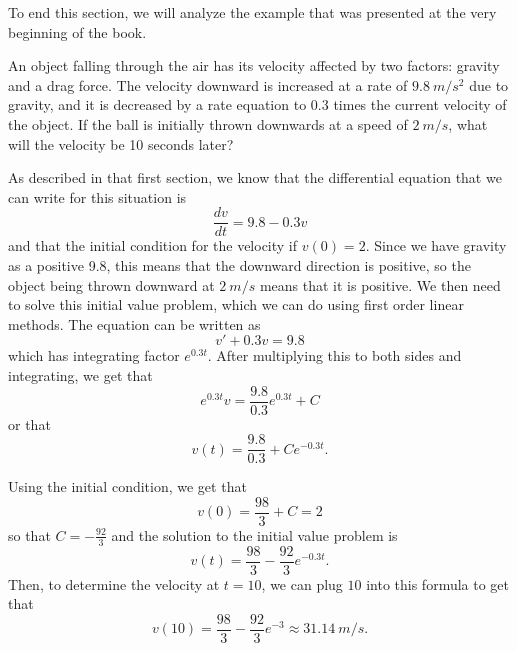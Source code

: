 To end this section, we will analyze the example that was presented at the very beginning of the book.

\begin{example}
An object falling through the air has its velocity affected by two factors: gravity and a drag force. The velocity downward is increased at a rate of $9.8\ m/s^2$ due to gravity, and it is decreased by a rate equation to $0.3$ times the current velocity of the object. If the ball is initially thrown downwards at a speed of $2\ m/s$, what will the velocity be 10 seconds later?
\end{example}

\begin{exampleSol}
As described in that first section, we know that the differential equation that we can write for this situation is
\begin{equation*}
\frac{dv}{dt} = 9.8 - 0.3v
\end{equation*}
and that the initial condition for the velocity if $v(0) = 2$. Since we have gravity as a positive 9.8, this means that the downward direction is positive, so the object being thrown downward at $2\ m/s$ means that it is positive. We then need to solve this initial value problem, which we can do using first order linear methods. The equation can be written as
\begin{equation*}
v' + 0.3v = 9.8
\end{equation*} which has integrating factor $e^{0.3t}$. After multiplying this to both sides and integrating, we get that
\begin{equation*}
e^{0.3t}v = \frac{9.8}{0.3}e^{0.3t} + C
\end{equation*} or that
\begin{equation*}
v(t) = \frac{9.8}{0.3} + Ce^{-0.3t}.
\end{equation*}

Using the initial condition, we get that
\begin{equation*}
v(0) = \frac{98}{3} + C = 2
\end{equation*}
so that $C = -\frac{92}{3}$ and the solution to the initial value problem is
\begin{equation*}
v(t) = \frac{98}{3} - \frac{92}{3}e^{-0.3t}.
\end{equation*}
Then, to determine the velocity at $t=10$, we can plug $10$ into this formula to get that
\begin{equation*}
v(10) = \frac{98}{3} - \frac{92}{3}e^{-3} \approx 31.14\ m/s.
\end{equation*}
\end{exampleSol}


